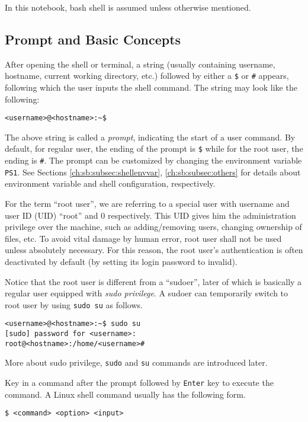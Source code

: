 In this notebook, bash shell is assumed unless otherwise mentioned.

\subsection{Prompt and Basic Concepts}

After opening the shell or terminal, a string (usually containing username, hostname, current working directory, etc.) followed by either a \verb|$| or \verb|#| appears, following which the user inputs the shell command. The string may look like the following:
\begin{lstlisting}
<username>@<hostname>:~$
\end{lstlisting}

The above string is called a \textit{prompt}, indicating the start of a user command. By default, for regular user, the ending of the prompt is \verb|$| while for the root user, the ending is \verb|#|. The prompt can be customized by changing the environment variable \verb|PS1|. See Sections \ref{ch:sb:subsec:shellenvvar}, \ref{ch:sb:subsec:others} for details about environment variable and shell configuration, respectively.

For the term ``root user'', we are referring to a special user with username and user ID (UID) ``root'' and 0 respectively. This UID gives him the administration privilege over the machine, such as adding/removing users, changing ownership of files, etc. To avoid vital damage by human error, root user shall not be used unless absolutely necessary. For this reason, the root user's authentication is often deactivated by default (by setting its login password to invalid).

Notice that the root user is different from a ``sudoer'', later of which is basically a regular user equipped with \textit{sudo privilege}. A sudoer can temporarily switch to root user by using \verb|sudo su| as follows.
\begin{lstlisting}
<username>@<hostname>:~$ sudo su
[sudo] password for <username>:
root@<hostname>:/home/<username>#
\end{lstlisting}
More about sudo privilege, \verb|sudo| and \verb|su| commands are introduced later.

Key in a command after the prompt followed by \verb|Enter| key to execute the command. A Linux shell command usually has the following form.
\begin{lstlisting}
$ <command> <option> <input>
\end{lstlisting}

